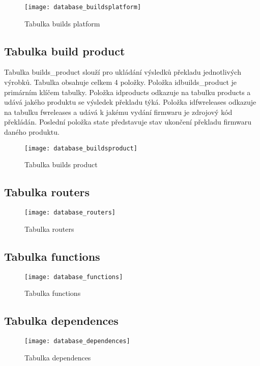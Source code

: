 \begin{figure}[h]
  \centering
  \texttt{[image: database\_buildsplatform]}
  \caption{Tabulka builds platform}
  \label{fig:database_buildsplatform}
\end{figure}

\subsection{Tabulka build product}
Tabulka builds\_product slouží pro ukládání výsledků překladu jednotlivých výrobků. Tabulka obsahuje celkem 4 položky. Položka idbuilds\_product je primárním klíčem tabulky. Položka idproducts odkazuje na tabulku products a udává jakého produktu se výsledek překladu týká. Položka idfwreleases odkazuje na tabulku fwreleases a udává k jakému vydání firmwaru je zdrojový kód překládán. Poslední položka state představuje stav ukončení překladu firmwaru daného produktu.

\begin{figure}[h]
  \centering
  \texttt{[image: database\_buildsproduct]}
  \caption{Tabulka builds product}
  \label{fig:database_buildsproduct}
\end{figure}

\subsection{Tabulka routers}

\begin{figure}[h]
  \centering
  \texttt{[image: database\_routers]}
  \caption{Tabulka routers}
  \label{fig:database_routers}
\end{figure}

\subsection{Tabulka functions}

\begin{figure}[h]
  \centering
  \texttt{[image: database\_functions]}
  \caption{Tabulka functions}
  \label{fig:database_functions}
\end{figure}

\subsection{Tabulka dependences}

\begin{figure}[h]
  \centering
  \texttt{[image: database\_dependences]}
  \caption{Tabulka dependences}
  \label{fig:database_dependences}
\end{figure}

